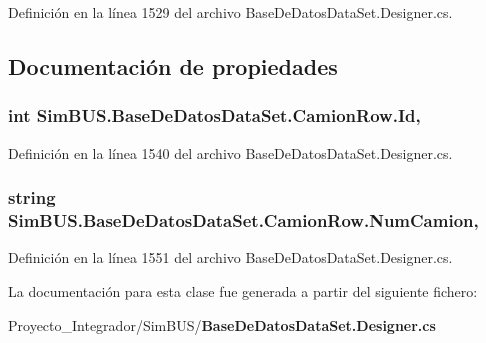 Definición en la línea 1529 del archivo Base\-De\-Datos\-Data\-Set.\-Designer.\-cs.



\subsection{Documentación de propiedades}
\subsubsection[{Id}]{\setlength{\rightskip}{0pt plus 5cm}int Sim\-B\-U\-S.\-Base\-De\-Datos\-Data\-Set.\-Camion\-Row.\-Id\hspace{0.3cm}{\ttfamily [get]}, {\ttfamily [set]}}\label{class_sim_b_u_s_1_1_base_de_datos_data_set_1_1_camion_row_a256015d9de78fb00c0608d167b621916}


Definición en la línea 1540 del archivo Base\-De\-Datos\-Data\-Set.\-Designer.\-cs.

\subsubsection[{Num\-Camion}]{\setlength{\rightskip}{0pt plus 5cm}string Sim\-B\-U\-S.\-Base\-De\-Datos\-Data\-Set.\-Camion\-Row.\-Num\-Camion\hspace{0.3cm}{\ttfamily [get]}, {\ttfamily [set]}}\label{class_sim_b_u_s_1_1_base_de_datos_data_set_1_1_camion_row_a921163d2346d7f0e4725800d265d1480}


Definición en la línea 1551 del archivo Base\-De\-Datos\-Data\-Set.\-Designer.\-cs.



La documentación para esta clase fue generada a partir del siguiente fichero\-:\begin{DoxyCompactItemize}
\item 
Proyecto\-\_\-\-Integrador/\-Sim\-B\-U\-S/{\bf Base\-De\-Datos\-Data\-Set.\-Designer.\-cs}\end{DoxyCompactItemize}
